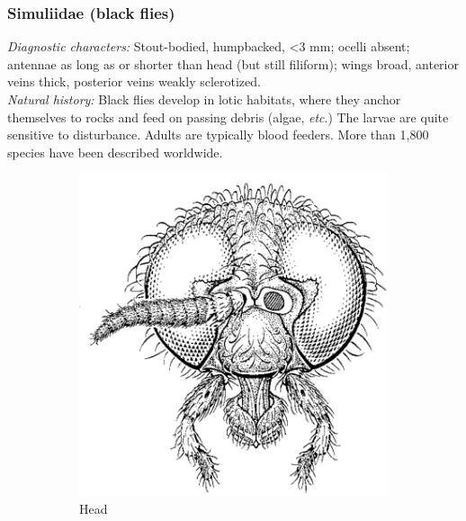 \documentclass[letterpaper, 11pt]{article}
\begin{document}
\subsubsection{Simuliidae (black flies)}
\noindent{}\textit{Diagnostic characters:} Stout-bodied, humpbacked, \textless3 mm; ocelli absent; antennae as long as or shorter than head (but still filiform); wings broad, anterior veins thick, posterior veins weakly sclerotized.\\

\noindent{}\textit{Natural history:} Black flies develop in lotic habitats, where they anchor themselves to rocks and feed on passing debris (algae, \textit{etc}.) The larvae are quite sensitive to disturbance. Adults are typically blood feeders. More than 1,800 species have been described worldwide.

\begin{figure}[ht!]
    \centering
    \begin{subfigure}[ht!]{0.32\textwidth}
        \includegraphics[width=\textwidth]{SimuliidHead}
        \caption{Head \citep[][Fig. 27.5]{mcalpine1981manual}}
        \label{fig:simuliid1}
    \end{subfigure}
    \qquad 
    \begin{subfigure}[ht!]{0.42\textwidth}

\end{subfigure}
\end{figure}
\end{document}
